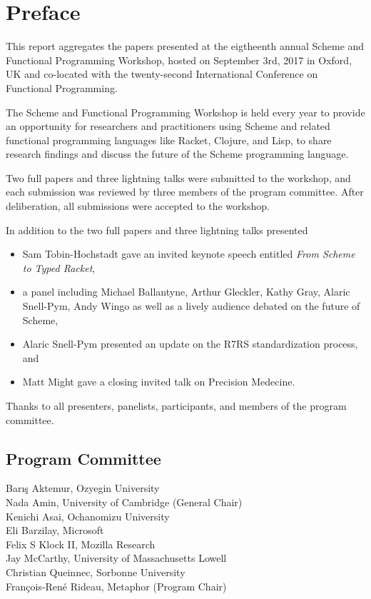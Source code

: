 \documentclass[a4paper]{book}
\date{September 3rd, 2017}
\author{Nada Amin \and Fran\c{c}ois-Ren\'e Rideau}
\begin{document}
\frontmatter
\setcounter{page}{3}  %
\chapter*{Preface}
This report aggregates the papers presented at the eigtheenth annual Scheme and
Functional Programming Workshop, hosted on September 3rd, 2017 in Oxford,
UK and co-located with the twenty-second International
Conference on Functional Programming.

\vspace{5pt}
\noindent
The Scheme and Functional Programming Workshop is held every year to provide an
opportunity for researchers and practitioners using Scheme and related
functional programming languages like Racket, Clojure, and Lisp, to share
research findings and discuss the future of the Scheme programming language.

\vspace{5pt}
\noindent
Two full papers and three lightning talks were submitted to the workshop, and each submission was reviewed by
three members of the program committee.  After deliberation, all submissions
were accepted to the workshop.

\vspace{5pt}
\noindent
In addition to the two full papers and three lightning talks presented
\begin{itemize}
\item Sam Tobin-Hochstadt gave an invited keynote speech entitled \textit{From Scheme to Typed Racket},
\item a panel including Michael Ballantyne, Arthur Gleckler, Kathy Gray, Alaric Snell-Pym, Andy Wingo as well as a lively audience debated on the future of Scheme,
\item Alaric Snell-Pym presented an update on the R7RS standardization process, and
\item Matt Might gave a closing invited talk on Precision Medecine.
\end{itemize}

\vspace{5pt}
\noindent
Thanks to all presenters, panelists, participants, and members of the
program committee.

\section*{Program Committee}
\begin{multicols}{2}
\noindent
Barış Aktemur, Ozyegin University\\
Nada Amin, University of Cambridge (General Chair)\\
Kenichi Asai, Ochanomizu University\\
Eli Barzilay, Microsoft\\
Felix S Klock II, Mozilla Research\\
Jay McCarthy, University of Massachusetts Lowell\\
Christian Queinnec, Sorbonne University\\
François-René Rideau, Metaphor (Program Chair)\\
\end{multicols}
\end{document}

